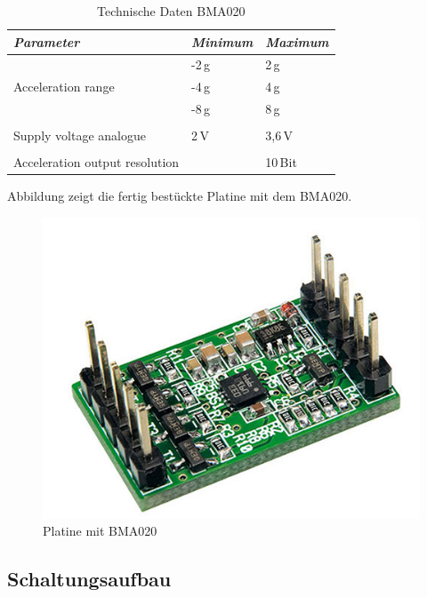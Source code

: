 \begin{table}[H]
\centering
\begin{tabular}{
lll
}
\toprule

\multicolumn{1}{p{5.5cm}}{\textit{Parameter}} & \multicolumn{1}{p{3cm}}{\textit{Minimum} }&\multicolumn{1}{p{3cm}}{\textit{Maximum}}\\\midrule
&-2\,g & 2\,g\\
Acceleration range & -4\,g & 4\,g\\
&-8\,g & 8\,g\\
&&\\
Supply voltage analogue & 2\,V & 3,6\,V\\
&&\\
Acceleration output resolution &&10\,Bit\\
\bottomrule
\end{tabular}
\caption{Technische Daten BMA020 \citep{Datenblatt_BMA020}}
\label{Tabelle_Technische_Daten_BMA020}
\end{table}

Abbildung zeigt die fertig bestückte Platine mit dem BMA020.

\begin{figure}[!h] 
  \centering
     \includegraphics[scale=.4]{BilderAllgemein/Beschleunigungssensor.png}
  \caption{Platine mit BMA020 \citep{Bild_BMA020}}
  \label{Abb_HYT221}
\end{figure}
\newpage

\subsection{Schaltungsaufbau}
\label{subsection_Schaltungsaufbau_BMA020}

